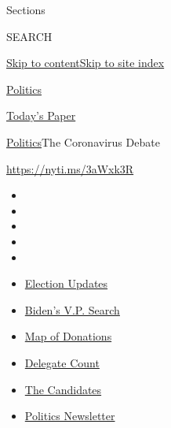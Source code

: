 Sections

SEARCH

\protect\hyperlink{site-content}{Skip to
content}\protect\hyperlink{site-index}{Skip to site index}

\href{https://www.nytimes.com/section/politics}{Politics}

\href{https://myaccount.nytimes.com/auth/login?response_type=cookie\&client_id=vi}{}

\href{https://www.nytimes.com/section/todayspaper}{Today's Paper}

\href{/section/politics}{Politics}\textbar{}The Coronavirus Debate

\url{https://nyti.ms/3aWxk3R}

\begin{itemize}
\item
\item
\item
\item
\item
\end{itemize}

\begin{itemize}
\item
  \href{https://www.nytimes.com/2020/07/31/us/elections/biden-vs-trump.html?action=click\&pgtype=Article\&state=default\&region=TOP_BANNER\&context=storylines_menu}{Election
  Updates}
\item
  \href{https://www.nytimes.com/article/biden-vice-president-2020.html?action=click\&pgtype=Article\&state=default\&region=TOP_BANNER\&context=storylines_menu}{Biden's
  V.P. Search}
\item
  \href{https://www.nytimes.com/interactive/2020/07/24/us/politics/trump-biden-campaign-donors.html?action=click\&pgtype=Article\&state=default\&region=TOP_BANNER\&context=storylines_menu}{Map
  of Donations}
\item
  \href{https://www.nytimes.com/interactive/2020/us/elections/delegate-count-primary-results.html?action=click\&pgtype=Article\&state=default\&region=TOP_BANNER\&context=storylines_menu}{Delegate
  Count}
\item
  \href{https://www.nytimes.com/interactive/2019/us/politics/2020-presidential-candidates.html?action=click\&pgtype=Article\&state=default\&region=TOP_BANNER\&context=storylines_menu}{The
  Candidates}
\item
  \href{https://www.nytimes.com/newsletters/politics?action=click\&pgtype=Article\&state=default\&region=TOP_BANNER\&context=storylines_menu}{Politics
  Newsletter}
\end{itemize}

